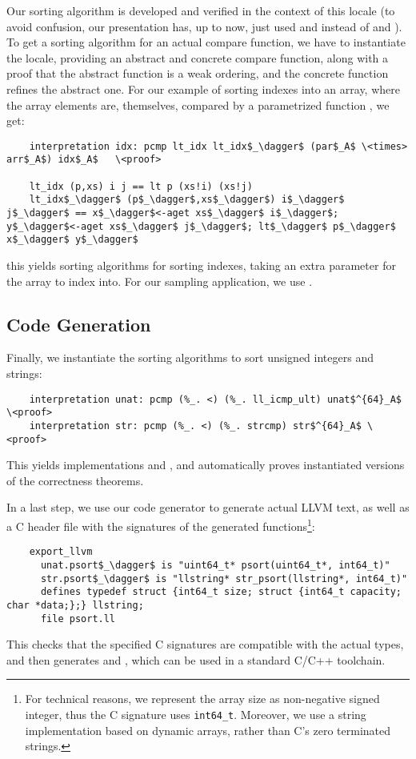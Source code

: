 \documentclass[a4paper,UKenglish,cleveref, autoref, thm-restate]{lipics-v2021}
\begin{document}
  Our sorting algorithm is developed and verified in the context of this locale (to avoid confusion, our presentation has, up to now, just used \is{<} and  instead of  and ).
  To get a sorting algorithm for an actual compare function, we have to instantiate the locale,
  providing an abstract and concrete compare function, along with a proof that the abstract function is a weak ordering,
  and the concrete function refines the abstract one. For our example of sorting indexes into an array,
  where the array elements are, themselves, compared by a parametrized function , we get:
  \begin{lstlisting}
    interpretation idx: pcmp lt_idx lt_idx$_\dagger$ (par$_A$ \<times> arr$_A$) idx$_A$   \<proof>

    lt_idx (p,xs) i j == lt p (xs!i) (xs!j)
    lt_idx$_\dagger$ (p$_\dagger$,xs$_\dagger$) i$_\dagger$ j$_\dagger$ == x$_\dagger$<-aget xs$_\dagger$ i$_\dagger$; y$_\dagger$<-aget xs$_\dagger$ j$_\dagger$; lt$_\dagger$ p$_\dagger$ x$_\dagger$ y$_\dagger$
  \end{lstlisting}
  this yields sorting algorithms for sorting indexes, taking an extra parameter for the array to index into.
  For our sampling application, we use .

  \subsection{Code Generation}
  Finally, we instantiate the sorting algorithms to sort unsigned integers and strings:
  \begin{lstlisting}
    interpretation unat: pcmp (%_. <) (%_. ll_icmp_ult) unat$^{64}_A$ \<proof>
    interpretation str: pcmp (%_. <) (%_. strcmp) str$^{64}_A$ \<proof>
  \end{lstlisting}
  This yields implementations  and , and automatically
  proves instantiated versions of the correctness theorems.

  In a last step, we use our code generator to generate actual LLVM text, as well as a C header file with the
  signatures of the generated functions\footnote{
    For technical reasons, we represent the array size as non-negative signed integer, thus the C signature uses \lstinline[language=C]{int64_t}.
    Moreover, we use a string implementation based on dynamic arrays, rather than C's zero terminated strings.
  }:
  \begin{lstlisting}
    export_llvm
      unat.psort$_\dagger$ is "uint64_t* psort(uint64_t*, int64_t)"
      str.psort$_\dagger$ is "llstring* str_psort(llstring*, int64_t)"
      defines typedef struct {int64_t size; struct {int64_t capacity; char *data;};} llstring;
      file psort.ll
  \end{lstlisting}
  This checks that the specified C signatures are compatible with the actual types, and then
  generates  and , which can be used in a standard C/C++ toolchain.
\end{document}
